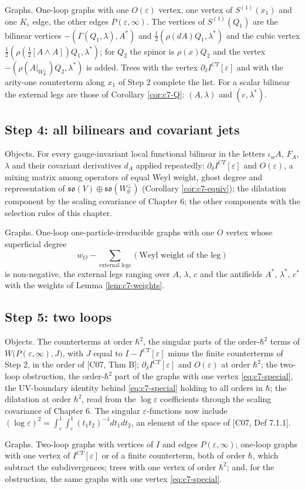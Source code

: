 Graphs. One-loop graphs with one $O(\varepsilon)$ vertex, one vertex of $S^{(1)}(x_1)$ and one $K_\varepsilon$ edge, the other edges $P(\varepsilon,\infty)$. The vertices of $S^{(1)}(Q_1)$ are the bilinear vertices $-(\Gamma(Q_1,\lambda),A^*)$ and $\tfrac12(\rho(dA)Q_1,\lambda^*)$ and the cubic vertex $\tfrac12(\rho(\tfrac12[A\wedge A])Q_1,\lambda^*)$; for $Q_2$ the spinor is $\rho(x)Q_2$ and the vertex $-(\rho(A|_{W_{\mathbb R}^\perp})Q_2,\lambda^*)$ is added. Trees with the vertex $\partial_\delta I^{CT}[\varepsilon]$ and with the arity-one counterterm along $x_1$ of Step 2 complete the list. For a scalar bilinear the external legs are those of Corollary \ref{cor:c7-Q}: $(A,\lambda)$ and $(c,\lambda^*)$.

\subsection{Step 4: all bilinears and covariant jets}

Objects. For every gauge-invariant local functional bilinear in the letters $\iota_wA$, $F_A$, $\lambda$ and their covariant derivatives $d_A$ applied repeatedly: $\partial_\delta I^{CT}[\varepsilon]$ and $O(\varepsilon)$, a mixing matrix among operators of equal Weyl weight, ghost degree and representation of $\mathfrak{so}(V)\oplus\mathfrak{so}(W_{\mathbb R}^\perp)$ (Corollary \ref{cor:c7-equiv}); the dilatation component by the scaling covariance of Chapter 6; the other components with the selection rules of this chapter.

Graphs. One-loop one-particle-irreducible graphs with one $O$ vertex whose superficial degree
\[
w_O-\sum_{\text{external legs}}(\text{Weyl weight of the leg})
\]
is non-negative, the external legs ranging over $A$, $\lambda$, $c$ and the antifields $A^*$, $\lambda^*$, $c^*$ with the weights of Lemma \ref{lem:c7-weights}.

\subsection{Step 5: two loops}

Objects. The counterterms at order $\hbar^2$, the singular parts of the order-$\hbar^2$ terms of $W\big(P(\varepsilon,\infty),J\big)$, with $J$ equal to $I-I^{CT}[\varepsilon]$ minus the finite counterterms of Step 2, in the order of [C07, Thm B]; $\partial_\delta I^{CT}[\varepsilon]$ and $O(\varepsilon)$ at order $\hbar^2$; the two-loop obstruction, the order-$\hbar^2$ part of the graphs with one vertex \eqref{eq:c7-special}, the UV-boundary identity behind \eqref{eq:c7-special} holding to all orders in $\hbar$; the dilatation at order $\hbar^2$, read from the $\log\varepsilon$ coefficients through the scaling covariance of Chapter 6. The singular $\varepsilon$-functions now include $(\log\varepsilon)^2=\int_\varepsilon^1\int_\varepsilon^1(t_1t_2)^{-1}dt_1dt_2$, an element of the space of [C07, Def 7.1.1].

Graphs. Two-loop graphs with vertices of $I$ and edges $P(\varepsilon,\infty)$; one-loop graphs with one vertex of $I^{CT}[\varepsilon]$ or of a finite counterterm, both of order $\hbar$, which subtract the subdivergences; trees with one vertex of order $\hbar^2$; and, for the obstruction, the same graphs with one vertex \eqref{eq:c7-special}.
